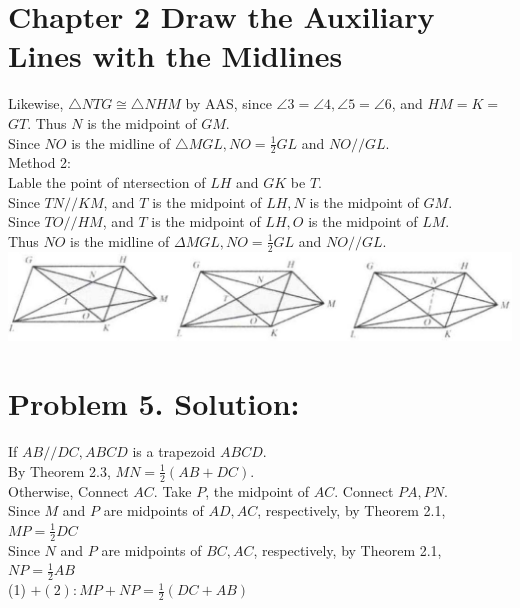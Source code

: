 \documentclass[10pt]{article}
\begin{document}
\section*{Chapter 2 Draw the Auxiliary Lines with the Midlines}
Likewise, \(\triangle N T G \cong \triangle N H M\) by AAS, since \(\angle 3=\angle 4, \angle 5=\angle 6\), and \(H M=K=\) \(G T\). Thus \(N\) is the midpoint of \(G M\).\\
Since \(N O\) is the midline of \(\triangle M G L, N O=\frac{1}{2} G L\) and \(N O / / G L\).\\
Method 2:\\
Lable the point of ntersection of \(L H\) and \(G K\) be \(T\).\\
Since \(T N / / K M\), and \(T\) is the midpoint of \(L H, N\) is the midpoint of \(G M\).\\
Since \(T O / / H M\), and \(T\) is the midpoint of \(L H, O\) is the midpoint of \(L M\).\\
Thus \(N O\) is the midline of \(\Delta M G L, N O=\frac{1}{2} G L\) and \(N O / / G L\).\\
\includegraphics[max width=\textwidth, center]{2025_04_17_97bc1f7e44d93c271a88g-049(1)}

\section*{Problem 5. Solution:}
If \(A B / / D C, A B C D\) is a trapezoid \(A B C D\).\\
By Theorem 2.3, \(M N=\frac{1}{2}(A B+D C)\).\\
Otherwise, Connect \(A C\). Take \(P\), the midpoint of \(A C\). Connect \(P A, P N\).\\
Since \(M\) and \(P\) are midpoints of \(A D, A C\), respectively, by Theorem 2.1,\\
\(M P=\frac{1}{2} D C\)\\
Since \(N\) and \(P\) are midpoints of \(B C, A C\), respectively, by Theorem 2.1,\\
\(N P=\frac{1}{2} A B\)\\
(1) \(+(2): M P+N P=\frac{1}{2}(D C+A B)\)
\end{document}
